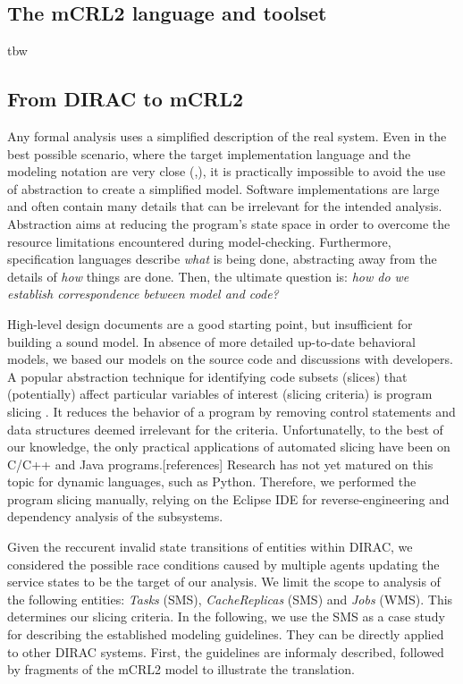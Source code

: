 \documentclass[10pt,conference]{IEEEtran}
\begin{document}
\subsection{The mCRL2 language and toolset}
tbw
\subsection{From DIRAC to mCRL2}

Any formal analysis uses a simplified description of the real system. Even in the 
best possible scenario, where the target implementation language and the modeling 
notation are very close (\cite{Java_PathFinder},\cite{Musuvathi04modelchecking}), 
it is practically impossible to avoid the use of abstraction to create a simplified model. 
Software implementations are large and often contain many details that can be irrelevant 
for the intended analysis. Abstraction aims at reducing
the program's state space in order to overcome the resource limitations \cite{Pelánek08fightingstate} encountered during model-checking.
Furthermore, specification languages describe \textit{what} is being done, 
abstracting away from the details of \textit{how} things are done. 
Then, the ultimate question is: \textit{how do we establish correspondence between model and code?}

High-level design documents are a good starting point, but insufficient for 
building a sound model.
In absence of more detailed up-to-date behavioral models, 
we based our models on the source code and discussions with developers.
A popular abstraction technique
for identifying code subsets (slices) that (potentially) affect particular 
variables of interest (slicing criteria) is program slicing \cite{Hatcliff99slicingsoftware}. 
It reduces the behavior of a program
by removing control statements and data structures deemed irrelevant for 
the criteria. Unfortunatelly, to the best of our knowledge, the only practical
applications of automated slicing have been
on C/C++ and Java programs.[references] Research has not yet
matured on this topic for dynamic languages, such as Python. 
Therefore, we performed the program slicing manually, relying on the Eclipse IDE for 
reverse-engineering and dependency analysis of the subsystems.

Given the reccurent invalid state transitions of entities within DIRAC, 
we considered the possible race conditions caused by multiple agents updating 
the service states to be the target of our analysis. We limit the scope
to analysis of the following entities: \textit{Tasks} (SMS), \textit{CacheReplicas} (SMS) and \textit{Jobs} (WMS).
This determines our slicing criteria. In the following, we use the SMS as a case study
for describing the established modeling guidelines. They can be 
directly applied to other DIRAC systems. First, the 
guidelines are informaly described, followed by fragments 
of the mCRL2 model to illustrate the translation.
\end{document}
